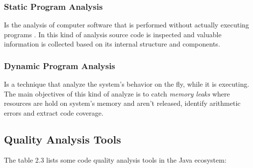 \subsubsection{Static Program Analysis}
 Is the analysis of computer software that is performed without actually executing programs \citep{Wichmann 1995}. In this kind of analysis source code is inspected and valuable information is collected based on its internal structure and components. 

\subsubsection{Dynamic Program Analysis}
Is a technique that analyze the system's behavior on the fly, while it is executing. The main objectives of this kind of analyze is to catch \textit{memory leaks} where resources are hold on system's memory and aren't released, identify arithmetic errors and extract code coverage. 


\subsection{Quality Analysis Tools}

The table 2.3 lists some code quality analysis tools in the Java ecosystem:

